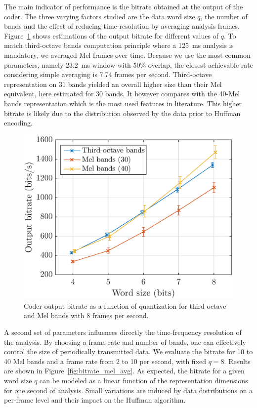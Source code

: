 \documentclass[final,3p,times,twocolumn]{elsarticle}
\begin{document}
The main indicator of performance is the bitrate obtained at the output of the coder. The three varying factors studied are the data word size $q$, the number of bands and the effect of reducing time-resolution by averaging analysis frames. Figure~\ref{fig:bitrate_q} shows estimations of the output bitrate for different values of $q$. To match third-octave bands computation principle where a 125~ms analysis is mandatory, we averaged Mel frames over time. Because we use the most common parameters, namely 23.2~ms window with 50\% overlap, the closest achievable rate considering simple averaging is 7.74 frames per second. Third-octave representation on 31 bands yielded an overall higher size than their Mel equivalent, here estimated for 30 bands. It however compares with the 40-Mel bands representation which is the most used features in literature. This higher bitrate is likely due to the distribution observed by the data prior to Huffman encoding.

\begin{figure}[htbp]
	\centering
		\includegraphics[width=\columnwidth]{figures/bitrate_qall.eps}
	\caption{Coder output bitrate as a function of quantization for third-octave and Mel bands with 8 frames per second.}
	\label{fig:bitrate_q}
\end{figure}

A second set of parameters influences directly the time-frequency resolution of the analysis. By choosing a frame rate and number of bands, one can effectively control the size of periodically transmitted data. We evaluate the bitrate for 10 to 40 Mel bands and a frame rate from 2 to 10 per second, with fixed $q = 8$. Results are shown in Figure~\ref{fig:bitrate_mel_avg}. As expected, the bitrate for a given word size $q$ can be modeled as a linear function of the representation dimensions for one second of analysis. Small variations are induced by data distributions on a per-frame level and their impact on the Huffman algorithm.
\end{document}
